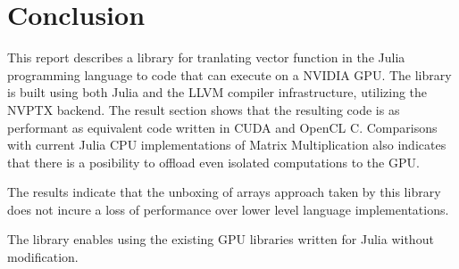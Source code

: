 \chapter{Conclusion}
\begin{markdown}

This report describes a library for tranlating vector function in the
Julia programming language to code that can execute on a NVIDIA
GPU. The library is built using both Julia and the LLVM compiler
infrastructure, utilizing the NVPTX backend. The result section shows
that the resulting code is as performant as equivalent code written in
CUDA and OpenCL C. Comparisons with current Julia CPU implementations
of Matrix Multiplication also indicates that there is a posibility to
offload even isolated computations to the GPU.

The results indicate that the unboxing of arrays approach taken by
this library does not incure a loss of performance over lower level
language implementations.

The library enables using the existing GPU libraries written for Julia
without modification.

\end{markdown}
